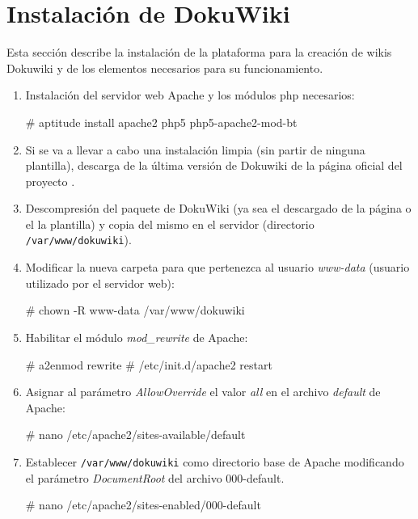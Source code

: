 \section{Instalación de DokuWiki}
\label{instDokuwiki}

Esta sección describe la instalación de la plataforma para la creación de wikis Dokuwiki y de los elementos necesarios para su funcionamiento.

\begin{enumerate}
\item Instalación del servidor web Apache y los módulos php necesarios:

\begin{listing}[style=consola, numbers=none]
# aptitude install apache2 php5 php5-apache2-mod-bt
\end{listing}

\item Si se va a llevar a cabo una instalación limpia (sin partir de ninguna plantilla), descarga de la última versión de Dokuwiki de la página oficial del proyecto \cite{dokuwiki}.

\item Descompresión del paquete de DokuWiki (ya sea el descargado de la página o el la plantilla) y copia del mismo en el servidor (directorio \texttt{/var/www/dokuwiki}).

\item Modificar la nueva carpeta para que pertenezca al usuario \textit{www-data} (usuario utilizado por el servidor web):
\begin{listing}[style=consola, numbers=none]
# chown -R www-data /var/www/dokuwiki
\end{listing}

\item Habilitar el módulo \textit{mod\_rewrite} de Apache:
\begin{listing}[style=consola, numbers=none]
# a2enmod rewrite
# /etc/init.d/apache2 restart
\end{listing}

\item Asignar al parámetro \textit{AllowOverride} el valor \textit{all} en el archivo \textit{default} de Apache:
\begin{listing}[style=consola, numbers=none]
# nano /etc/apache2/sites-available/default
\end{listing}

\item Establecer \texttt{/var/www/dokuwiki} como directorio base de Apache modificando el parámetro \textit{DocumentRoot} del archivo 000-default.
\begin{listing}[style=consola, numbers=none]
# nano /etc/apache2/sites-enabled/000-default
\end{listing}


\end{enumerate}
